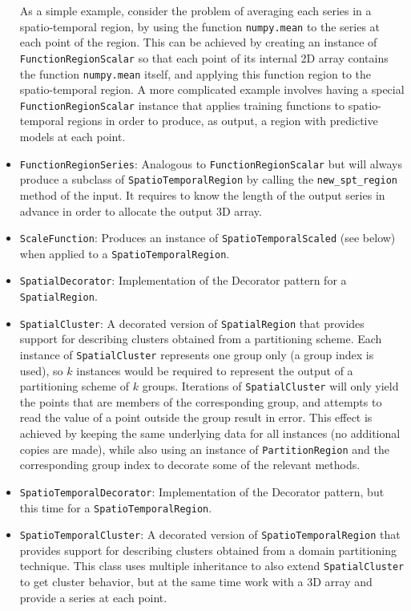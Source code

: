 \begin{itemize}
	As a simple example, consider the problem of averaging each series in a spatio-temporal region, by using the function \texttt{numpy.mean} to the series at each point of the region. This can be achieved by creating an instance of \texttt{FunctionRegionScalar} so that each point of its internal 2D array contains the function \texttt{numpy.mean} itself, and applying this function region to the spatio-temporal region. A more complicated example involves having a special \texttt{FunctionRegionScalar} instance that applies training functions to spatio-temporal regions in order to produce, as output, a region with predictive models at each point.
	
	\item \texttt{FunctionRegionSeries}: Analogous to \texttt{FunctionRegionScalar} but will always produce a subclass of \texttt{SpatioTemporalRegion} by calling the \texttt{new\_spt\_region} method of the input. It requires to know the length of the output series in advance in order to allocate the output 3D array.
	
	\item \texttt{ScaleFunction}: Produces an instance of \texttt{SpatioTemporalScaled} (see below) when applied to a \texttt{SpatioTemporalRegion}.
	
	\item \texttt{SpatialDecorator}: Implementation of the Decorator pattern for a \texttt{SpatialRegion}.
	
	\item \texttt{SpatialCluster}: A decorated version of \texttt{SpatialRegion} that provides support for describing clusters obtained from a partitioning scheme. Each instance of \texttt{SpatialCluster} represents one group only (a group index is used), so $k$ instances would be required to represent the output of a partitioning scheme of $k$ groups. Iterations of \texttt{SpatialCluster} will only yield the points that are members of the corresponding group, and attempts to read the value of a point outside the group result in error. This effect is achieved by keeping the same underlying data for all instances (no additional copies are made), while also using an instance of \texttt{PartitionRegion} and the corresponding group index to decorate some of the relevant methods.
	
	\item \texttt{SpatioTemporalDecorator}: Implementation of the Decorator pattern, but this time for a \texttt{SpatioTemporalRegion}.
	
	\item \texttt{SpatioTemporalCluster}: A decorated version of \texttt{SpatioTemporalRegion} that provides support for describing clusters obtained from a domain partitioning technique. This class uses multiple inheritance to also extend \texttt{SpatialCluster} to get cluster behavior, but at the same time work with a 3D array and provide a series at each point.
	

\end{itemize}
